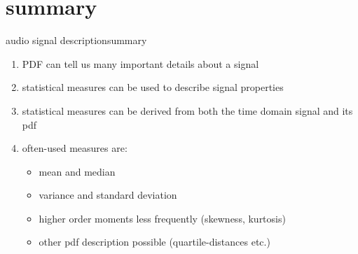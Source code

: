 \section{summary}
\begin{frame}{audio signal description}{summary}
    \begin{enumerate}
        \item   PDF can tell us many important details about a signal
        \smallskip
        \item<2->   statistical measures can be used to describe signal properties
        \smallskip
        \item<3->   statistical measures can be derived from both the time domain signal and its pdf
        \smallskip
        \item<4->   often-used measures are:
            \begin{itemize}
                \item   mean and median
                \item   variance and standard deviation
                \item   higher order moments less frequently (skewness, kurtosis)
                \item   other pdf description possible (quartile-distances etc.)
            \end{itemize}
    \end{enumerate}
\end{frame}		

    


